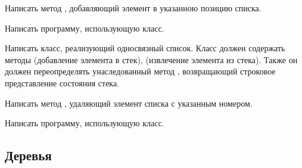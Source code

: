 Написать метод , добавляющий элемент в указанною позицию
списка.

Написать программу, использующую класс.

\task Написать класс, реализующий односвязный список. Класс должен
содержать методы  (добавление элемента в стек), 
(извлечение элемента из стека). Также он должен переопределять
унаследованный метод , возвращающий строковое
представление состояния стека.

Написать метод , удаляющий элемент списка с указанным
номером.

Написать программу, использующую класс.


\subsection{Деревья}

\task 

\task

\task

\task

\task

\task

\task

\task

\task

\task

